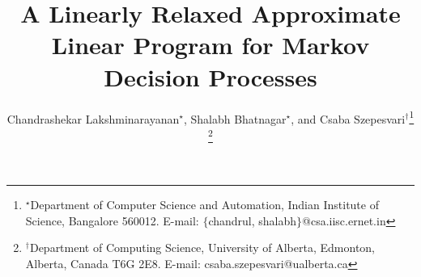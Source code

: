 \documentclass[12pt,draftcls,onecolumn]{IEEEtran}
\title{A Linearly Relaxed Approximate Linear Program for Markov Decision Processes}
\author{Chandrashekar Lakshminarayanan$^\star$, Shalabh Bhatnagar$^\star$,
 and Csaba Szepesvari$^\dagger$\thanks{$^\star$Department of Computer
Science and Automation, Indian Institute of Science, Bangalore 560012.
E-mail: $\{$chandrul, shalabh$\}$@csa.iisc.ernet.in}
\thanks{$^\dagger$Department of Computing Science, University of Alberta,
Edmonton, Alberta, Canada T6G 2E8. E-mail: csaba.szepesvari@ualberta.ca}}
\begin{document}
\maketitle



%


%


%


%
%
%
%
%
%
\printbibliography
\newpage
\onecolumn
%
\end{document}

